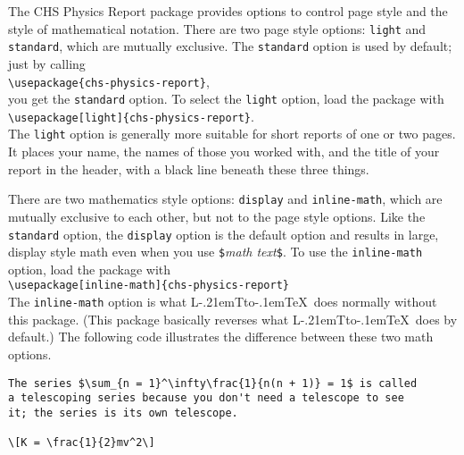 \documentclass[12pt]{ltxdoc}
\makeatletter
\def\LaTeX{ L\kern -.21em{\sbox \z@ T\vbox to\ht \z@ {\hbox {\check@mathfonts \fontsize \sf@size \z@ \math@fontsfalse \selectfont A}\vss }}\kern -.1em\TeX}%
\makeatother
\begin{document}
The CHS Physics Report package provides options to control page style and the style of mathematical notation. There are two page style options: \texttt{light} and \texttt{standard}, which are mutually exclusive. The \texttt{standard} option is used by default; just by calling \\[\parskip]\indent\verb|\usepackage{chs-physics-report}|, \\[\parskip]you get the \verb|standard| option. To select the \texttt{light} option, load the package with\\[\parskip]\indent\verb|\usepackage[light]{chs-physics-report}|.\\[\parskip] The \verb|light| option is generally more suitable for short reports of one or two pages. It places your name, the names of those you worked with, and the title of your report in the header, with a black line beneath these three things.

There are two mathematics style options: \verb|display| and \verb|inline-math|, which are mutually exclusive to each other, but not to the page style options. Like the \texttt{standard} option, the \verb|display| option is the default option and results in large, display style math even when you use \verb|$|\emph{math text}\verb|$|. To use the \verb|inline-math| option, load the package with\\[2.5mm]\indent\verb|\usepackage[inline-math]{chs-physics-report}|\\[2.5mm]The \verb|inline-math| option is what \LaTeX\ does normally without this package. (This package basically reverses what \LaTeX\ does by default.) The following code illustrates the difference between these two math options.

\begin{lstlisting}[numbers = none, pos = t]
The series $\sum_{n = 1}^\infty\frac{1}{n(n + 1)} = 1$ is called
a telescoping series because you don't need a telescope to see
it; the series is its own telescope.

\[K = \frac{1}{2}mv^2\]
\end{lstlisting}

\pagebreak
\end{document}
